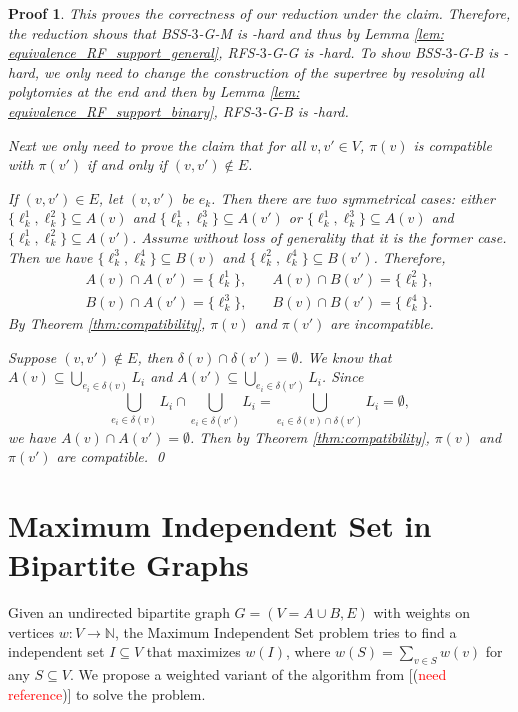 \documentclass[twocolumn]{bmcart}%
\newcommand{\note}[1]{(\textcolor{red}{#1})}
\newcommand{\bssthree}{\textsc{BSS-$3$}\xspace}
\newcommand{\rfthree}{\textsc{RFS-$3$}\xspace}
\newcommand{\B}{\textsc{B}\xspace}
\renewcommand{\G}{\textsc{G}\xspace}
\renewcommand{\M}{\textsc{M}\xspace}
\theoremstyle{mystyle}
\theoremstyle{proofstyle}
\newtheorem*{proof2}{Proof}
\newenvironment{proofnospace}{\begin{proof2}}{\qed \end{proof2}}
\begin{document}
\begin{proofnospace}
  This proves the correctness of our reduction under the claim. Therefore, the reduction shows that \bssthree-\G-\M is \NP-hard and thus by Lemma \ref{lem: equivalence_RF_support_general}, \rfthree-\G-\G is \NP-hard. To show \bssthree-\G-\B is \NP-hard, we only need to change the construction of the supertree by resolving all polytomies at the end and then by Lemma \ref{lem: equivalence_RF_support_binary}, \rfthree-\G-\B is \NP-hard. 
  
  Next we only need to prove the claim that for all $v,v' \in V$, $\pi(v)$ is compatible with $\pi(v')$ if and only if $(v,v') \notin E$.

  If $(v,v') \in E$, let $(v,v')$ be $e_k$. Then there are two symmetrical cases: either $\{\ell_k^1,\ell_k^2\} \subseteq A(v)$ and $\{\ell_k^1,\ell_k^3\} \subseteq A(v')$ or $\{\ell_k^1,\ell_k^3\} \subseteq A(v)$ and $\{\ell_k^1,\ell_k^2\} \subseteq A(v')$. Assume without loss of generality that it is the former case. Then we have  $\{\ell_k^3,\ell_k^4\} \subseteq B(v)$ and $\{\ell_k^2,\ell_k^4\} \subseteq B(v')$. Therefore, 
  \begin{align*}
      A(v) \cap A(v') = \{\ell_k^1\}, \quad &A(v) \cap B(v') = \{\ell_k^2\}, \\
      B(v) \cap A(v')= \{\ell_k^3\}, \quad &B(v) \cap B(v') = \{\ell_k^4\}.
  \end{align*} 
  By Theorem \ref{thm:compatibility}, $\pi(v)$ and $\pi(v')$ are incompatible.
  
  Suppose $(v,v') \notin E$, then $\delta(v) \cap \delta(v') = \emptyset$. We know that $A(v) \subseteq \bigcup_{e_i \in \delta(v)}L_i$ and $A(v') \subseteq \bigcup_{e_i \in \delta(v')}L_i$. Since \[\bigcup_{e_i \in \delta(v)}L_i \cap \bigcup_{e_i\in\delta(v')} L_i = \bigcup_{e_i \in \delta(v) \cap \delta(v')} L_i = \emptyset,\] 
  we have $A(v) \cap A(v') = \emptyset$. Then by Theorem \ref{thm:compatibility}, $\pi(v)$ and $\pi(v')$ are compatible.  
\end{proofnospace}

\section{Maximum Independent Set in Bipartite Graphs}
Given an undirected bipartite graph $G= (V = A \cup B, E)$ with weights on vertices $w: V \to \mathbb{N}$, the Maximum Independent Set problem tries to find a independent set $I \subseteq V$ that maximizes $w(I)$, where $w(S) = \sum_{v\in S}w(v)$ for any $S \subseteq V$. We propose a weighted variant of the algorithm from [\note{need reference}] to solve the problem. 
\end{document}

